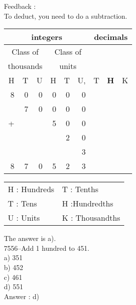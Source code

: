 \documentclass[letterpaper, 12pt]{article}
\begin{document}
Feedback :\\
To deduct, you need to do a subtraction.
\begin{center}
\begin{tabular}{|rrr|rrr|rrr|}
\hline
\multicolumn{6}{|c|}{integers} &\multicolumn{3}{|c|}{decimals} \\
\hline
\multicolumn{3}{|c|}{Class of} &\multicolumn{3}{|c|}{Class of} &  \multicolumn{3}{c|}{} \\
\multicolumn{3}{|c|}{thousands} &\multicolumn{3}{|c|}{units} &  \multicolumn{3}{c|}{} \\
\hline
H & T & U &H & T & U, & T\up{th} & \textbf{H\up{th}} & K\up{th} \\
\hline
\hline
8 & 0 & 0 & 0 & 0 & 0 &  & &\\
 & 7 & 0 & 0 & 0 & 0 &  & &\\
+ &  &  & 5 & 0 & 0 &  & &\\
 &  &  &  & 2 & 0 &  & &\\
 &  &  &  &  & 3 &  & &\\
\hline
\hline
 8 & 7 & 0 & 5 & 2 & 3 &  & &
\\
\hline
\end{tabular}
\end{center}

\scriptsize
\begin{center}
\begin{tabular}{ll}
H : Hundreds & T\up{th} : Tenths\\
T : Tens & H\up{th} :Hundredths\\
U : Units & K\up{e} : Thousandths\\
\end{tabular}
\end{center}

\normalsize
The answer is a).\\



7556--Add 1 hundred to 451.\\

a) 351\\
b) 452\\
c) 461\\
d) 551\\

Answer : d)\\
\end{document}
